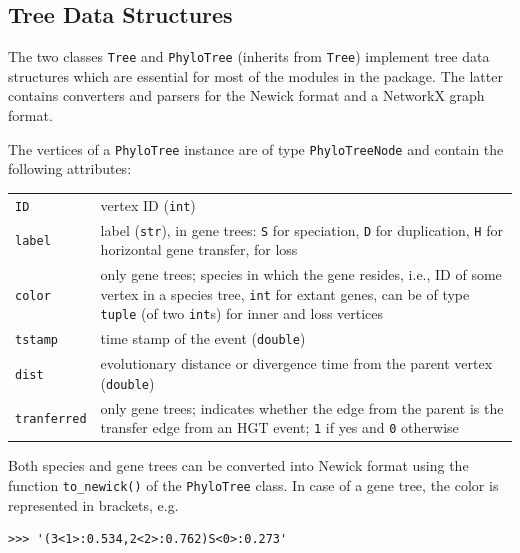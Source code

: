 \documentclass[hidelinks,11pt]{article}
\newcommand{\sq}{\textquotesingle}
\begin{document}
\subsection{Tree Data Structures}

The two classes \texttt{Tree} and \texttt{PhyloTree} (inherits from \texttt{Tree}) implement tree data structures which are essential for most of the modules in the package.
The latter contains converters and parsers for the Newick format and a NetworkX graph format.

The vertices of a \texttt{PhyloTree} instance are of type \texttt{PhyloTreeNode} and contain the following attributes:

\vspace{3mm}
\renewcommand{\arraystretch}{1.5}

{\small\centering
\begin{longtable}{ p{3.0cm} p{10cm} }
	\texttt{ID} & vertex ID (\texttt{int})\\
	\texttt{label}  & label (\texttt{str}), in gene trees: \texttt{\sq S\sq} for
	speciation, \texttt{\sq D\sq} for duplication, \texttt{\sq H\sq} for
	horizontal gene transfer, \texttt{\sq *\sq} for loss\\
	\texttt{color} & only gene trees; species in which the gene resides, i.e., ID of some vertex in a species tree, \texttt{int} for extant genes, can be of type \texttt{tuple} (of two \texttt{int}s) for inner and loss vertices\\
	\texttt{tstamp} & time stamp of the event (\texttt{double})\\
	\texttt{dist} & evolutionary distance or divergence time from the parent vertex (\texttt{double})\\
	\texttt{tranferred} & only gene trees; indicates whether the edge from the parent is the transfer edge from an HGT event; \texttt{1} if yes and \texttt{0} otherwise \\
\end{longtable}
}
\vspace{3mm}

Both species and gene trees can be converted into Newick format using the function \texttt{to\_newick()} of the \texttt{PhyloTree} class.
In case of a gene tree, the color is represented in brackets, e.g.

\begin{adjustwidth}{1cm}{1cm}\vspace{2mm}
\begin{verbatim}
>>> '(3<1>:0.534,2<2>:0.762)S<0>:0.273'
\end{verbatim}
\end{adjustwidth}
\end{document}
